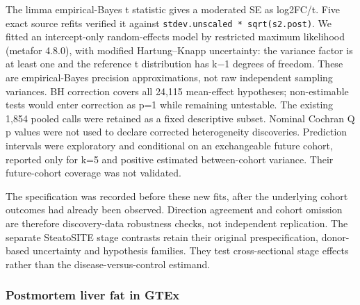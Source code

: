 The limma empirical-Bayes t statistic gives a moderated SE as log2FC/t. Five
exact source refits verified it against \texttt{stdev.unscaled\ *\ sqrt(s2.post)}.
We fitted an intercept-only random-effects model by restricted maximum
likelihood (metafor 4.8.0), with modified Hartung--Knapp uncertainty: the variance
factor is at least one and the reference t distribution has k−1 degrees of
freedom. These are empirical-Bayes precision approximations, not raw independent
sampling variances. BH correction covers all 24,115 mean-effect hypotheses;
non-estimable tests would enter correction as p=1 while remaining untestable.
The existing 1,854 pooled calls were retained as a fixed descriptive subset.
Nominal Cochran Q p values were not used to declare corrected heterogeneity
discoveries. Prediction intervals were exploratory and conditional on an
exchangeable future cohort, reported only for k=5 and positive estimated
between-cohort variance. Their future-cohort coverage was not validated.

The specification was recorded before these new fits, after the underlying
cohort outcomes had already been observed. Direction agreement and cohort
omission are therefore discovery-data robustness checks, not independent
replication. The separate SteatoSITE stage contrasts retain their original
prespecification, donor-based uncertainty and hypothesis families. They test
cross-sectional stage effects rather than the disease-versus-control estimand.

\subsubsection{Postmortem liver fat in GTEx}\label{postmortem-liver-fat-in-gtex}

